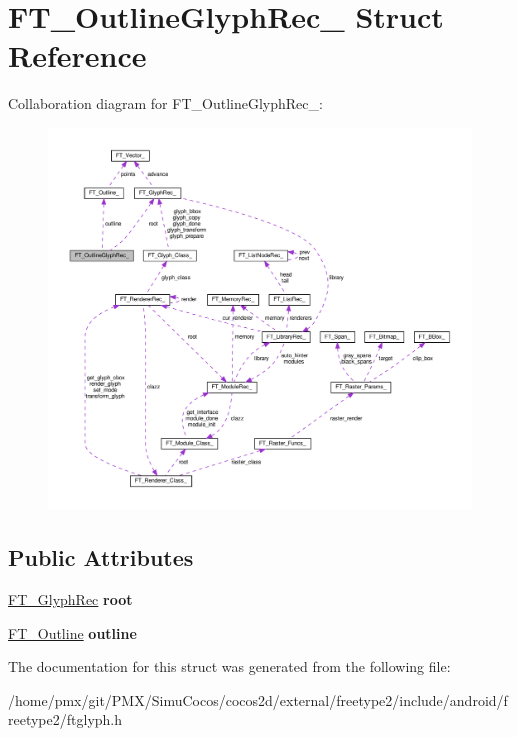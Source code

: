 \hypertarget{structFT__OutlineGlyphRec__}{}\section{F\+T\+\_\+\+Outline\+Glyph\+Rec\+\_\+ Struct Reference}
\label{structFT__OutlineGlyphRec__}


Collaboration diagram for F\+T\+\_\+\+Outline\+Glyph\+Rec\+\_\+\+:
\nopagebreak
\begin{figure}[H]
\begin{center}
\leavevmode
\includegraphics[width=350pt]{structFT__OutlineGlyphRec____coll__graph}
\end{center}
\end{figure}
\subsection*{Public Attributes}
\begin{DoxyCompactItemize}
\item 
\mbox{\label{structFT__OutlineGlyphRec___a71e5a8d5fe69e0cea68c96486dd6713f}} 
\hyperlink{structFT__GlyphRec__}{F\+T\+\_\+\+Glyph\+Rec} {\bfseries root}
\item 
\mbox{\label{structFT__OutlineGlyphRec___af1bd473a32fcbc500edcfcf89e3ac8ac}} 
\hyperlink{structFT__Outline__}{F\+T\+\_\+\+Outline} {\bfseries outline}
\end{DoxyCompactItemize}


The documentation for this struct was generated from the following file\+:\begin{DoxyCompactItemize}
\item 
/home/pmx/git/\+P\+M\+X/\+Simu\+Cocos/cocos2d/external/freetype2/include/android/freetype2/ftglyph.\+h\end{DoxyCompactItemize}
